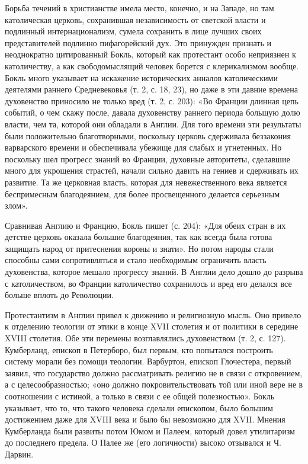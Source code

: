 Борьба течений в христианстве имела место, конечно, и на Западе, но там
католическая церковь, сохранившая независимость от светской власти и подлинный
интернационализм, сумела сохранить в лице лучших своих представителей подлинно
пифагорейский дух. Это принужден признать и неоднократно цитированный Бокль,
который как протестант особо неприязнен к католичеству, а как свободомыслящий
человек борется с клерикализмом вообще. Бокль много указывает на искажение
исторических анналов католическими деятелями раннего Средневековья (т. 2, с.
18, 23), но даже в эти давние времена духовенство приносило не только вред (т.
2, с. 203): «Во Франции длинная цепь событий, о чем скажу после, давала
духовенству раннего периода большую долю власти, чем та, которой они обладали в
Англии. Для того времени эти результаты были положительно благотворными,
поскольку церковь сдерживала беззакония варварского времени и обеспечивала
убежище для слабых и угнетенных. Но поскольку шел прогресс знаний во Франции,
духовные авторитеты, сделавшие много для укрощения страстей, начали сильно
давить на гениев и сдерживать их развитие. Та же церковная власть, которая для
невежественного века является беспримесным благодеянием, для более
просвещенного делается серьезным злом».

Сравнивая Англию и Францию, Бокль пишет (с. 204): «Для обеих стран в их детстве
церковь оказала большие благодеяния, так как всегда была готова защищать народ
от притеснения короны и знати». Но потом народы стали способны сами
сопротивляться и стало необходимым ограничить власть духовенства, которое
мешало прогрессу знаний. В Англии дело дошло до разрыва с католичеством, во
Франции католичество сохранилось и вред его делался все больше вплоть до
Революции.

Протестантизм в Англии привел к движению и религиозную мысль. Оно привело к
отделению теологии от этики в конце XVII столетия и
от политики в середине XVIII столетия. Обе эти перемены возглавлялись
духовенством (т. 2, с. 127). Кумберланд, епископ в Петерборо, был первым, кто
попытался построить систему морали без помощи теологии. Варбуртон, епископ
Глочестера, первый заявил, что государство должно рассматривать религию не в
связи с откровением, а с целесообразностью; «оно должно покровительствовать той
или иной вере не в соотношении с истиной, а только в связи с ее общей
полезностью». Бокль указывает, что то, что такого человека сделали епископом,
было большим достижением даже для XVIII века и было бы невозможно для XVII.
Мнения Кумберланда были развиты потом Юмом и Палеем, который довел утилитаризм
до последнего предела. О Палее же (его логичности) высоко отзывался и Ч.
Дарвин.

